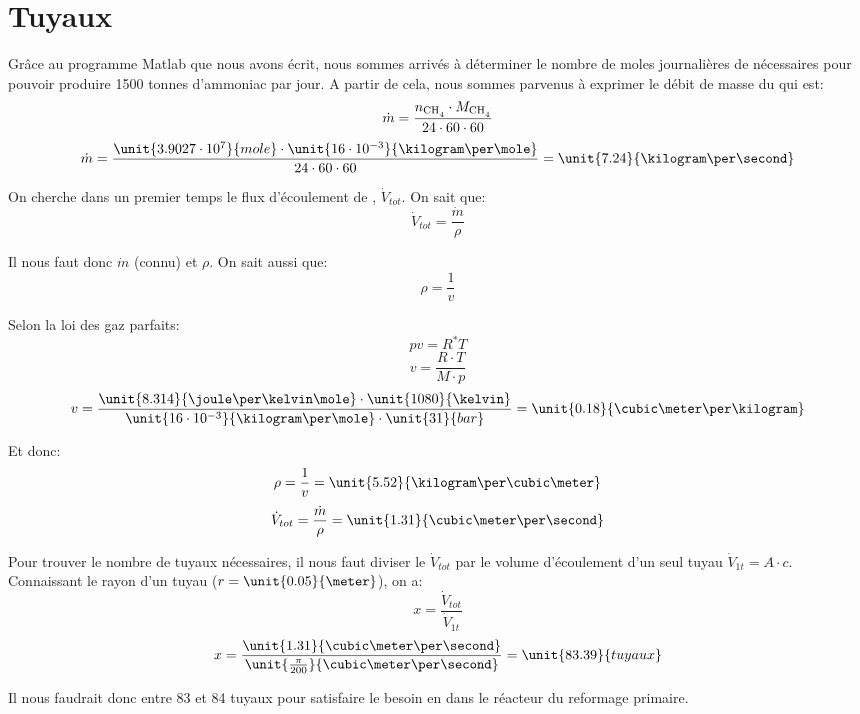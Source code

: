 \documentclass{article}
\begin{document}
\section*{Tuyaux}

Grâce au programme Matlab que nous avons écrit, nous sommes arrivés à déterminer le nombre de moles journalières de  nécessaires pour pouvoir produire 1500 tonnes d'ammoniac par jour. A partir de cela, nous sommes parvenus à exprimer le débit de masse du  qui est: 
	$$\dot{m}=\frac{n_{\ce{CH4}}\cdot M_{\ce{CH4}}}{24\cdot60\cdot60}$$
	$$\dot{m}=\frac{\unit{3.9027\cdot10^7}{mole}\cdot\unit{16\cdot10^{-3}}{\kilogram\per\mole}}{24\cdot60\cdot60}=\unit{7.24}{\kilogram\per\second}$$

On cherche dans un premier temps le flux d'écoulement de , $\dot{V}_{tot}$. On sait que: 
	$$\dot{V}_{tot}=\frac{\dot{m}}{\rho}$$

Il nous faut donc $\dot{m}$ (connu) et $\rho$. On sait aussi que:
	$$\rho = \frac{1}{v}$$

Selon la loi des gaz parfaits:
	$$pv=R^{*}T$$
	$$v=\frac{R\cdot T}{M\cdot p}$$
	$$v=\frac{\unit{8.314}{\joule\per\kelvin\mole}\cdot\unit{1080}{\kelvin}}{\unit{16\cdot10^{-3}}{\kilogram\per\mole}\cdot\unit{31}{bar}}=\unit{0.18}{\cubic\meter\per\kilogram}$$

Et donc:
	$$\rho = \frac{1}{v} = \unit{5.52}{\kilogram\per\cubic\meter}$$
	$$\dot{V}_{tot} = \frac{\dot{m}}{\rho}=\unit{1.31}{\cubic\meter\per\second}$$

Pour trouver le nombre de tuyaux nécessaires, il nous faut diviser le $\dot{V}_{tot}$ par le volume d'écoulement d'un seul tuyau $\dot{V}_{1t} = A\cdot c$. Connaissant le rayon d'un tuyau ($r=\unit{0.05}{\meter}$), on a:
	$$x = \frac{\dot{V}_{tot}}{\dot{V}_{1t}}$$
	$$x = \frac{\unit{1.31}{\cubic\meter\per\second}}{\unit{\frac{\pi}{200}}{\cubic\meter\per\second}}=\unit{83.39}{tuyaux}$$
	
Il nous faudrait donc entre 83 et 84 tuyaux pour satisfaire le besoin en  dans le réacteur du reformage primaire.
\end{document}
